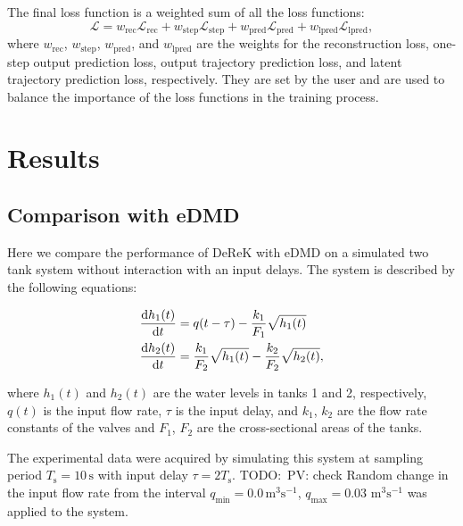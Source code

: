 \documentclass[conference]{IEEEtran}
\newcommand{\ui}[2]{#1_{\text{#2}}}
\newcommand{\todo}[1]{{{\color{red} TODO:~#1	}} }
\begin{document}
The final loss function is a weighted sum of all the loss functions:
\begin{equation}
    \mathcal{L} = \ui{w}{rec}\mathcal{L}_{\text{rec}} + \ui{w}{step}\mathcal{L}_{\text{step}} + \ui{w}{pred}\mathcal{L}_{\text{pred}} + \ui{w}{lpred}\mathcal{L}_{\text{lpred}},
\end{equation}
where \(\ui{w}{rec}\), \(\ui{w}{step}\), \(\ui{w}{pred}\), and \(\ui{w}{lpred}\) are the weights for the reconstruction loss, one-step output prediction loss, output trajectory prediction loss, and latent trajectory prediction loss, respectively. They are set by the user and are used to balance the importance of the loss functions in the training process.


\section{Results}

\subsection{Comparison with eDMD}

Here we compare the performance of DeReK with eDMD on a simulated two tank system without interaction with an input delays. The system is described by the following equations:

\begin{equation}\label{eq:two_tanks_system}
    \begin{aligned}
        \diff{h_1(t)}{t} & = q(t-\tau) - \frac{k_1}{F_1}\sqrt{h_1(t)}                     \\
        \diff{h_2(t)}{t} & = \frac{k_1}{F_2}\sqrt{h_1(t)} - \frac{k_2}{F_2}\sqrt{h_2(t)},
    \end{aligned}
\end{equation}

where \(h_1(t)\) and \(h_2(t)\) are the water levels in tanks 1 and 2, respectively, \(q(t)\) is the input flow rate, \(\tau \) is the input delay, and \(k_1\), \(k_2\) are the flow rate constants of the valves and \(F_1\), \(F_2\) are the cross-sectional areas of the tanks.

The experimental data were acquired by simulating this system at sampling period \( \ui{T}{s} = 10 \, \mathrm{s} \) with input delay \( \tau = 2\ui{T}{s} \). \todo{PV: check} Random change in the input flow rate from the interval \( \ui{q}{min} = 0.0 \, \text{m}^3\text{s}^{-1} \), \( \ui{q}{max} = 0.03 \) \( \text{m}^3\text{s}^{-1} \) was applied to the system.
\end{document}
